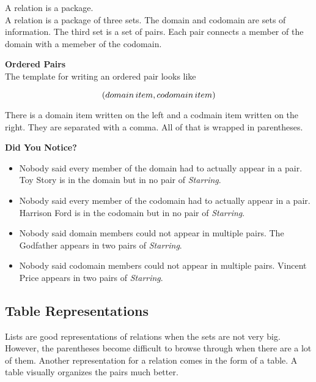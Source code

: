 \documentclass{ximera}
\begin{document}
A relation is a package.  \\

A relation is a package of three sets. The domain and codomain are sets of information.  The third set is a set of pairs.  Each pair connects a member of the domain with a memeber of the codomain. 


\begin{template} \textbf{\textcolor{purple!85!blue}{Ordered Pairs}}  \\
The template for writing an ordered pair looks like  

\[
\large{( domain \, item, codomain \, item )}
\]
\end{template}

There is a domain item written on the left and a codmain item written on the right.  They are separated with a comma.  All of that is wrapped in parentheses.


\begin{warning} \textbf{\textcolor{red!80!black}{Did You Notice?}}  \\
\begin{itemize}
\item Nobody said every member of the domain had to actually appear in a pair.  Toy Story is in the domain but in no pair of \textit{Starring}.
\item Nobody said every member of the codomain had to actually appear in a pair.  Harrison Ford is in the codomain but in no pair of \textit{Starring}.
\item Nobody said domain members could not appear in multiple pairs.  The Godfather appears in two pairs of \textit{Starring}.
\item Nobody said codomain members could not appear in multiple pairs.  Vincent Price appears in two pairs of \textit{Starring}.
\end{itemize}
\end{warning}
















\subsection{Table Representations}



Lists are good representations of relations when the sets are not very big. However, the parentheses become difficult to browse through when there are a lot of them. Another representation for a relation comes in the form of a table. A table visually organizes the pairs much better.
\end{document}

